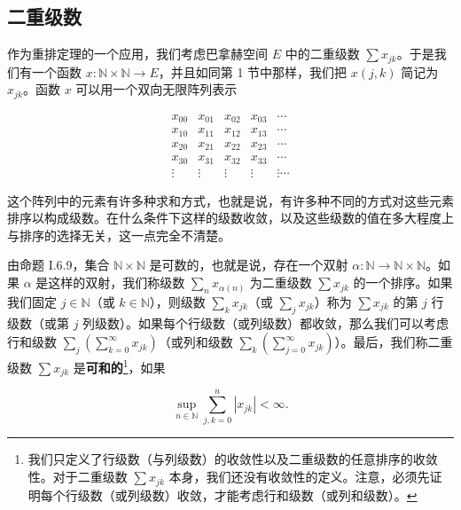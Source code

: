 \subsection*{二重级数}

作为重排定理的一个应用，我们考虑巴拿赫空间 $ E $ 中的二重级数 $ \sum x_{jk} $。于是我们有一个函数 $ x: \mathbb{N} \times \mathbb{N} \to E $，并且如同第 1 节中那样，我们把 $ x(j, k) $ 简记为 $ x_{jk} $。函数 $ x $ 可以用一个双向无限阵列表示

\begin{equation}
\begin{array}{ccccc} x_{00} & x_{01} & x_{02} & x_{03} & \cdots \\ x_{10} & x_{11} & x_{12} & x_{13} & \cdots \\ x_{20} & x_{21} & x_{22} & x_{23} & \cdots \\ x_{30} & x_{31} & x_{32} & x_{33} & \cdots \\ \vdots & \vdots & \vdots & \vdots & \vdots \cdots \end{array}
\end{equation}

这个阵列中的元素有许多种求和方式，也就是说，有许多种不同的方式对这些元素排序以构成级数。在什么条件下这样的级数收敛，以及这些级数的值在多大程度上与排序的选择无关，这一点完全不清楚。

由命题 I.6.9，集合 $\mathbb{N} \times \mathbb{N}$ 是可数的，也就是说，存在一个双射 $\alpha: \mathbb{N} \to \mathbb{N} \times \mathbb{N}$。如果 $\alpha$ 是这样的双射，我们称级数 $\sum_n x_{\alpha(n)}$ 为二重级数 $\sum x_{jk}$ 的一个排序。如果我们固定 $j \in \mathbb{N}$（或 $k \in \mathbb{N}$），则级数 $\sum_k x_{jk}$（或 $\sum_j x_{jk}$）称为 $\sum x_{jk}$ 的第 $j$ 行级数（或第 $j$ 列级数）。如果每个行级数（或列级数）都收敛，那么我们可以考虑行和级数 $\sum_j (\sum_{k=0}^{\infty} x_{jk})$（或列和级数 $\sum_k (\sum_{j=0}^{\infty} x_{jk})$）。最后，我们称二重级数 $\sum x_{jk}$ 是\textbf{可和的}\footnote{我们只定义了行级数（与列级数）的收敛性以及二重级数的任意排序的收敛性。对于二重级数 $\sum x_{jk}$ 本身，我们还没有收敛性的定义。注意，必须先证明每个行级数（或列级数）收敛，才能考虑行和级数（或列和级数）。}，如果

\[
\sup_{n\in\mathbb{N}}\sum_{j,k=0}^{n}\left|x_{j k}\right|<\infty.
\]

